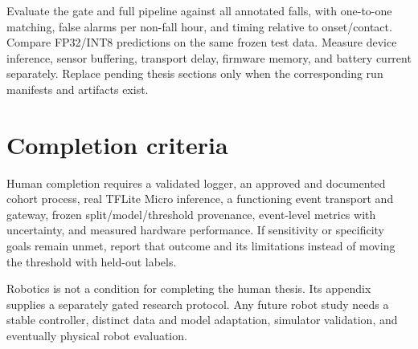 Evaluate the gate and full pipeline against all annotated falls, with one-to-one matching, false alarms per non-fall hour, and timing relative to onset/contact. Compare FP32/INT8 predictions on the same frozen test data. Measure device inference, sensor buffering, transport delay, firmware memory, and battery current separately. Replace pending thesis sections only when the corresponding run manifests and artifacts exist.

\section{Completion criteria}
Human completion requires a validated logger, an approved and documented cohort process, real TFLite Micro inference, a functioning event transport and gateway, frozen split/model/threshold provenance, event-level metrics with uncertainty, and measured hardware performance. If sensitivity or specificity goals remain unmet, report that outcome and its limitations instead of moving the threshold with held-out labels.

Robotics is not a condition for completing the human thesis. Its appendix supplies a separately gated research protocol. Any future robot study needs a stable controller, distinct data and model adaptation, simulator validation, and eventually physical robot evaluation.

